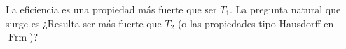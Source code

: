 \documentclass[11pt]{amsart}
\DeclareMathOperator{\tp}{tp}
\DeclareMathOperator{\Frm}{Frm}
\theoremstyle{plain}
\newtheorem{prop}[thm]{Proposition}
\theoremstyle{definition}
\begin{document}
La eficiencia es una propiedad más fuerte que ser $T_1$. La pregunta natural que surge es ¿Resulta ser más fuerte que $T_2$ (o las propiedades tipo Hausdorff en $\Frm$)?






%

    
\end{document}
